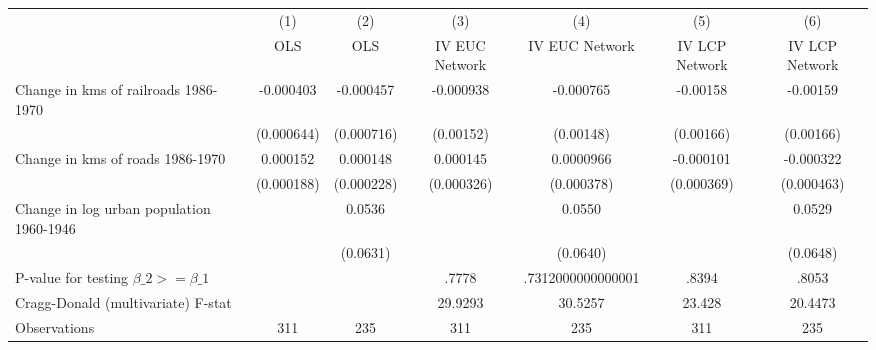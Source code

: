 {
\def\sym#1{\ifmmode^{#1}\else\(^{#1}\)\fi}
\begin{tabular}{l*{6}{c}}
\hline\hline
                &\multicolumn{1}{c}{(1)}&\multicolumn{1}{c}{(2)}&\multicolumn{1}{c}{(3)}&\multicolumn{1}{c}{(4)}&\multicolumn{1}{c}{(5)}&\multicolumn{1}{c}{(6)}\\
                &\multicolumn{1}{c}{OLS}&\multicolumn{1}{c}{OLS}&\multicolumn{1}{c}{IV EUC Network}&\multicolumn{1}{c}{IV EUC Network}&\multicolumn{1}{c}{IV LCP Network}&\multicolumn{1}{c}{IV LCP Network}\\
\hline
Change in kms of railroads 1986-1970&-0.000403         &-0.000457         &-0.000938         &-0.000765         & -0.00158         & -0.00159         \\
                &(0.000644)         &(0.000716)         &(0.00152)         &(0.00148)         &(0.00166)         &(0.00166)         \\
[1em]
Change in kms of roads 1986-1970& 0.000152         & 0.000148         & 0.000145         &0.0000966         &-0.000101         &-0.000322         \\
                &(0.000188)         &(0.000228)         &(0.000326)         &(0.000378)         &(0.000369)         &(0.000463)         \\
[1em]
Change in log urban population 1960-1946&                  &   0.0536         &                  &   0.0550         &                  &   0.0529         \\
                &                  & (0.0631)         &                  & (0.0640)         &                  & (0.0648)         \\
\hline
P-value for testing $\beta\_{2} >= \beta\_{1}$&                  &                  &    .7778         &.7312000000000001         &    .8394         &    .8053         \\
Cragg-Donald (multivariate) F-stat&                  &                  &  29.9293         &  30.5257         &   23.428         &  20.4473         \\
Observations    &      311         &      235         &      311         &      235         &      311         &      235         \\
\hline\hline
\end{tabular}
}
